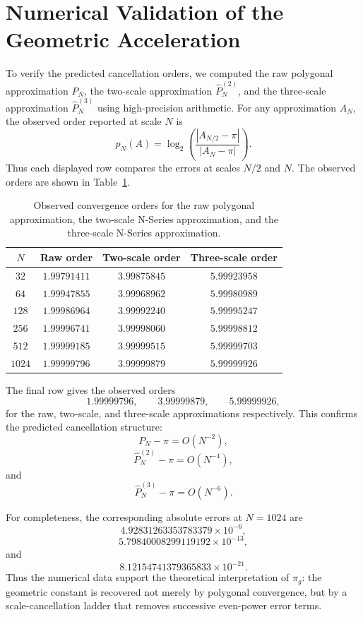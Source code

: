 \documentclass[11pt]{article}
\begin{document}
\section{Numerical Validation of the Geometric Acceleration}

To verify the predicted cancellation orders, we computed the raw polygonal
approximation $P_N$, the two-scale approximation $\widehat{P}^{(2)}_N$, and
the three-scale approximation $\widehat{P}^{(3)}_N$ using high-precision
arithmetic. For any approximation $A_N$, the observed order reported at
scale $N$ is
\[
  p_N(A)=\log_2\!\left(
  \frac{|A_{N/2}-\pi|}{|A_N-\pi|}
  \right).
\]
Thus each displayed row compares the errors at scales $N/2$ and $N$. The
observed orders are shown in Table~\ref{tab:pi-g-orders}.

\begin{table}[ht]
\centering
\small
\begin{tabular}{cccc}
\toprule
$N$ & Raw order & Two-scale order & Three-scale order \\
\midrule
$32$   & $1.99791411$ & $3.99875845$ & $5.99923958$ \\
$64$   & $1.99947855$ & $3.99968962$ & $5.99980989$ \\
$128$  & $1.99986964$ & $3.99992240$ & $5.99995247$ \\
$256$  & $1.99996741$ & $3.99998060$ & $5.99998812$ \\
$512$  & $1.99999185$ & $3.99999515$ & $5.99999703$ \\
$1024$ & $1.99999796$ & $3.99999879$ & $5.99999926$ \\
\bottomrule
\end{tabular}
\caption{Observed convergence orders for the raw polygonal approximation, the two-scale N-Series approximation, and the three-scale N-Series approximation.}
\label{tab:pi-g-orders}
\end{table}

The final row gives the observed orders
\[
  1.99999796, \qquad 3.99999879, \qquad 5.99999926,
\]
for the raw, two-scale, and three-scale approximations respectively. This
confirms the predicted cancellation structure:
\[
  P_N-\pi = O(N^{-2}),
\]
\[
  \widehat{P}^{(2)}_N-\pi = O(N^{-4}),
\]
and
\[
  \widehat{P}^{(3)}_N-\pi = O(N^{-6}) .
\]

For completeness, the corresponding absolute errors at $N=1024$ are
\[
  4.92831263353783379\times 10^{-6},
\]
\[
  5.79840008299119192\times 10^{-13},
\]
and
\[
  8.12154741379365833\times 10^{-21} .
\]
Thus the numerical data support the theoretical interpretation of $\pi_g$:
the geometric constant is recovered not merely by polygonal convergence, but
by a scale-cancellation ladder that removes successive even-power error terms.
\end{document}
